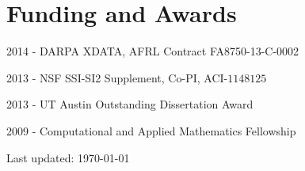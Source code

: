 \documentclass[letterpaper]{article}
\def\footerlink{}
\renewenvironment{itemize}{
  \begin{list}{}{
    \setlength{\leftmargin}{1.5em}
  }
}{
  \end{list}
}
\begin{document}

\section*{Funding and Awards}
\begin{itemize}
\item 2014 - DARPA XDATA, AFRL Contract FA8750-13-C-0002
\item 2013 - NSF SSI-SI2 Supplement, Co-PI, ACI-$1148125$
\item 2013 - UT Austin Outstanding Dissertation Award
\item 2009 - Computational and Applied Mathematics Fellowship
\end{itemize}


\bigskip

\begin{center}
  \begin{footnotesize}
    Last updated: \today \\
    \href{\footerlink}{\texttt{\footerlink}}
  \end{footnotesize}
\end{center}
\end{document}
